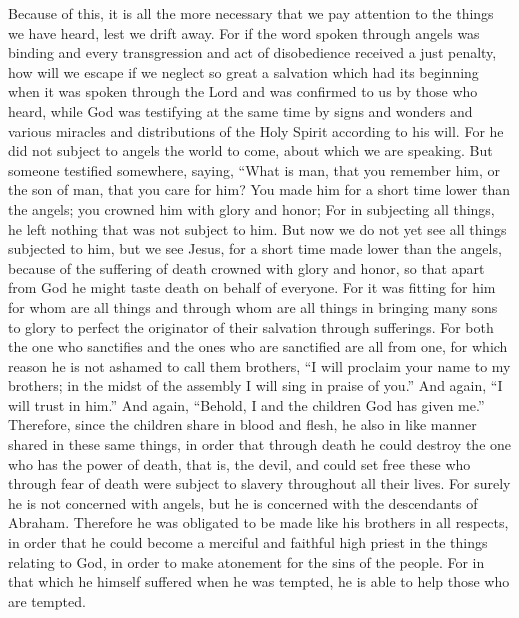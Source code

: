 \begin{biblechapter} %
 Because of this, it is all the more necessary that we pay attention to the things we have heard, lest we drift away.
\verse For if the word spoken through angels was binding and every transgression and act of disobedience received a just penalty,
\verse how will we escape if we neglect so great a salvation which had its beginning when it was spoken through the Lord and was confirmed to us by those who heard,
\verse while God was testifying at the same time by signs and wonders and various miracles and distributions of the Holy Spirit according to his will.
 For he did not subject to angels the world to come, about which we are speaking.
\verse But someone testified somewhere, saying,
\verse “What is man, that you remember him, 
or the son of man, that you care for him?
\verse You made him for a short time lower than the angels; 
you crowned him with glory and honor;
\verse For in subjecting all things, he left nothing that was not subject to him. But now we do not yet see all things subjected to him,
\verse but we see Jesus, for a short time made lower than the angels, because of the suffering of death crowned with glory and honor, so that apart from God he might taste death on behalf of everyone.
\verse For it was fitting for him for whom are all things and through whom are all things in bringing many sons to glory to perfect the originator of their salvation through sufferings.
\verse For both the one who sanctifies and the ones who are sanctified are all from one, for which reason he is not ashamed to call them brothers, “I will proclaim your name to my brothers; 
in the midst of the assembly I will sing in praise of you.”
\verse And again, “I will trust in him.” And again, “Behold, I and the children God has given me.”
\verse Therefore, since the children share in blood and flesh, he also in like manner shared in these same things, in order that through death he could destroy the one who has the power of death, that is, the devil,
\verse and could set free these who through fear of death were subject to slavery throughout all their lives.
\verse For surely he is not concerned with angels, but he is concerned with the descendants of Abraham.
\verse Therefore he was obligated to be made like his brothers in all respects, in order that he could become a merciful and faithful high priest in the things relating to God, in order to make atonement for the sins of the people.
\verse For in that which he himself suffered when he was tempted, he is able to help those who are tempted.
\end{biblechapter}

